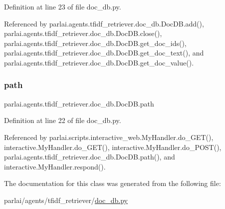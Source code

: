 Definition at line 23 of file doc\+\_\+db.\+py.



Referenced by parlai.\+agents.\+tfidf\+\_\+retriever.\+doc\+\_\+db.\+Doc\+D\+B.\+add(), parlai.\+agents.\+tfidf\+\_\+retriever.\+doc\+\_\+db.\+Doc\+D\+B.\+close(), parlai.\+agents.\+tfidf\+\_\+retriever.\+doc\+\_\+db.\+Doc\+D\+B.\+get\+\_\+doc\+\_\+ids(), parlai.\+agents.\+tfidf\+\_\+retriever.\+doc\+\_\+db.\+Doc\+D\+B.\+get\+\_\+doc\+\_\+text(), and parlai.\+agents.\+tfidf\+\_\+retriever.\+doc\+\_\+db.\+Doc\+D\+B.\+get\+\_\+doc\+\_\+value().

\mbox{\label{classparlai_1_1agents_1_1tfidf__retriever_1_1doc__db_1_1DocDB_a9c5c8366fec3e2a732ae544fa29a70a6}} 
\subsubsection{\texorpdfstring{path}{path}}
{\footnotesize\ttfamily parlai.\+agents.\+tfidf\+\_\+retriever.\+doc\+\_\+db.\+Doc\+D\+B.\+path}



Definition at line 22 of file doc\+\_\+db.\+py.



Referenced by parlai.\+scripts.\+interactive\+\_\+web.\+My\+Handler.\+do\+\_\+\+G\+E\+T(), interactive.\+My\+Handler.\+do\+\_\+\+G\+E\+T(), interactive.\+My\+Handler.\+do\+\_\+\+P\+O\+S\+T(), parlai.\+agents.\+tfidf\+\_\+retriever.\+doc\+\_\+db.\+Doc\+D\+B.\+path(), and interactive.\+My\+Handler.\+respond().



The documentation for this class was generated from the following file\+:\begin{DoxyCompactItemize}
\item 
parlai/agents/tfidf\+\_\+retriever/\hyperlink{doc__db_8py}{doc\+\_\+db.\+py}\end{DoxyCompactItemize}
